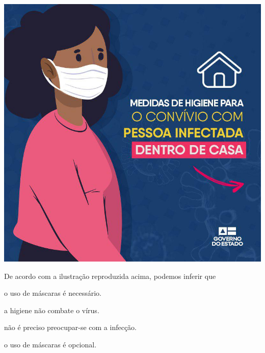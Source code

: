 \begin{myquote}
\begin{myescolha}
\begin{myquote}
\begin{center}
\includegraphics[width=.8\textwidth]{./imgQ4PORT/media/image5.jpeg}
\end{center}

\end{myquote}

De acordo com a ilustração reproduzida acima, podemos inferir que

\begin{escolha}
  \item o uso de máscaras é necessário.

  \item a higiene não combate o vírus.

  \item não é preciso preocupar-se com a infecção.

  \item o uso de máscaras é opcional.
\end{escolha}
\pagebreak


\end{myescolha}
\end{myquote}
